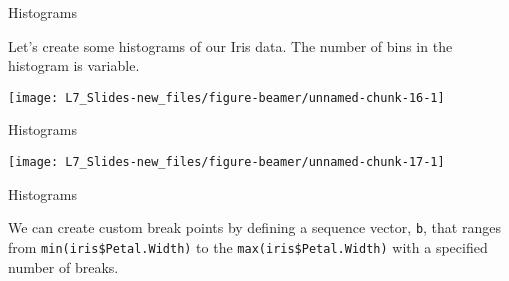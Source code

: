 \documentclass[ignorenonframetext,]{beamer}
\newenvironment{Shaded}{\begin{snugshade}}{\end{snugshade}}
\newcommand{\KeywordTok}[1]{\textcolor[rgb]{0.13,0.29,0.53}{\textbf{{#1}}}}
\newcommand{\DataTypeTok}[1]{\textcolor[rgb]{0.13,0.29,0.53}{{#1}}}
\newcommand{\DecValTok}[1]{\textcolor[rgb]{0.00,0.00,0.81}{{#1}}}
\newcommand{\StringTok}[1]{\textcolor[rgb]{0.31,0.60,0.02}{{#1}}}
\newcommand{\NormalTok}[1]{{#1}}
\begin{document}
\begin{frame}[fragile]{Histograms}

Let's create some histograms of our Iris data. The number of bins in the
histogram is variable.

\small

\begin{Shaded}
\end{Shaded}

\begin{center}\texttt{[image: L7\_Slides-new\_files/figure-beamer/unnamed-chunk-16-1]} \end{center}

\end{frame}

\begin{frame}[fragile]{Histograms}

\small

\begin{Shaded}
\end{Shaded}

\begin{center}\texttt{[image: L7\_Slides-new\_files/figure-beamer/unnamed-chunk-17-1]} \end{center}

\end{frame}

\begin{frame}[fragile]{Histograms}

We can create custom break points by defining a sequence vector,
\texttt{b}, that ranges from \texttt{min(iris\$Petal.Width)} to the
\texttt{max(iris\$Petal.Width)} with a specified number of breaks.

\small

\begin{Shaded}
\end{Shaded}

\end{frame}
\end{document}
